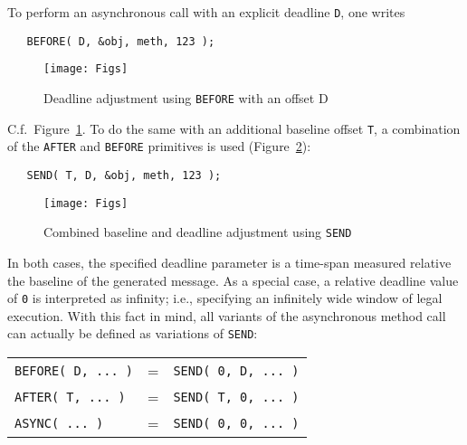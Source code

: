 \documentclass[12pt]{article}
\begin{document}
To perform an asynchronous call with an explicit deadline {\tt D}, one writes
\begin{verbatim}
   BEFORE( D, &obj, meth, 123 );
\end{verbatim}
\begin{figure}
\texttt{[image: Figs]}
\caption{\label{fig:before}Deadline adjustment using {\tt BEFORE} with an offset D}
\end{figure}
C.f.\ Figure~\ref{fig:before}. To do the same with an additional baseline offset {\tt T}, a combination of the {\tt AFTER} and {\tt BEFORE} primitives is used (Figure~\ref{fig:send}):
\begin{verbatim}
   SEND( T, D, &obj, meth, 123 );
\end{verbatim}
\begin{figure}
\texttt{[image: Figs]}
\caption{\label{fig:send}Combined baseline and deadline adjustment using {\tt SEND}}
\end{figure}
In both cases, the specified deadline parameter is a time-span measured relative the baseline of the generated message. As a special case, a relative deadline value of {\tt 0} is interpreted as infinity; i.e., specifying an infinitely wide window of legal execution. With this fact in mind, all variants of the asynchronous method call can actually be defined as variations of {\tt SEND}:
\begin{center}
\begin{tabular}{lll}
    {\tt BEFORE( D, ... )} & = & {\tt SEND( 0, D, ... )} \\
    {\tt AFTER( T, ... )}  & = & {\tt SEND( T, 0, ... )} \\
    {\tt ASYNC( ... )}     & = & {\tt SEND( 0, 0, ... )}
\end{tabular}
\end{center}
\end{document}
